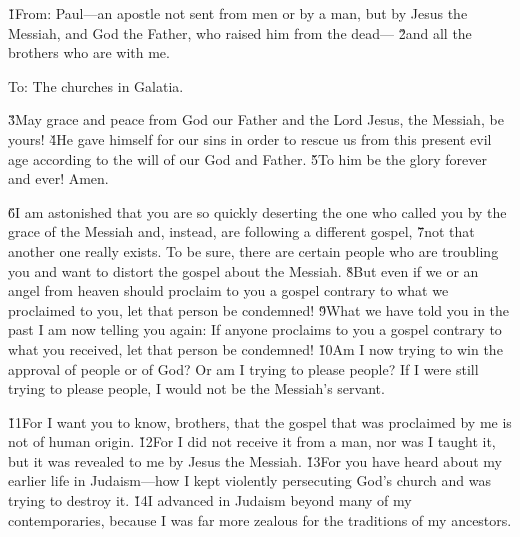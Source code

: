 


\v{1}From: Paul---an apostle not sent from men or by a man, but by Jesus the Messiah, and God the Father, who raised him from the dead--- \v{2}and all the brothers who are with me.

To: The churches in Galatia.

\v{3}May grace and peace from God our Father and the Lord Jesus, the Messiah, be yours! \v{4}He gave himself for our sins in order to rescue us from this present evil age according to the will of our God and Father. \v{5}To him be the glory forever and ever! Amen.

\v{6}I am astonished that you are so quickly deserting the one who called you by the grace of the Messiah and, instead, are following a different gospel, \v{7}not that another one really exists. To be sure, there are certain people who are troubling you and want to distort the gospel about the Messiah. \v{8}But even if we or an angel from heaven should proclaim to you a gospel contrary to what we proclaimed to you, let that person be condemned! \v{9}What we have told you in the past I am now telling you again: If anyone proclaims to you a gospel contrary to what you received, let that person be condemned! \v{10}Am I now trying to win the approval of people or of God? Or am I trying to please people? If I were still trying to please people, I would not be the Messiah's servant.

\v{11}For I want you to know, brothers, that the gospel that was proclaimed by me is not of human origin. \v{12}For I did not receive it from a man, nor was I taught it, but it was revealed to me by Jesus the Messiah. \v{13}For you have heard about my earlier life in Judaism---how I kept violently persecuting God's church and was trying to destroy it. \v{14}I advanced in Judaism beyond many of my contemporaries, because I was far more zealous for the traditions of my ancestors.

